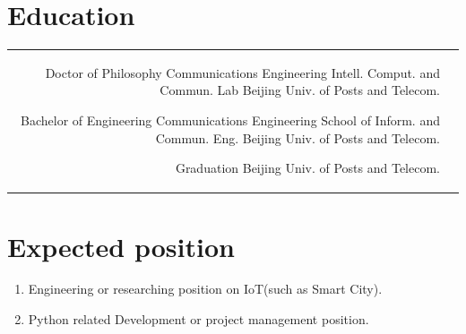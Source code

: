 \documentclass[10pt]{article} %
\begin{document}
\begin{paracol}{2}
\section{Education} 
\begin{supertabular}{rl} %
	
	
	{Doctor of Philosophy} %
	{Communications Engineering} %
	{Intell. Comput. and Commun. Lab} %
	{Beijing Univ. of Posts and Telecom.} %
	
	
	{Bachelor of Engineering} %
	{Communications Engineering} %
	{School of Inform. and Commun. Eng.} %
	{Beijing Univ. of Posts and Telecom.} %
	
	{Graduation}%
	{} %
	{} %
	{Beijing Univ. of Posts and Telecom.} %
\end{supertabular}

\section{Expected position}

\begin{enumerate}[font=\color{headings}\bfseries] %
	
	
	\item Engineering or researching position on IoT(such as Smart City).
	
	
	\item Python related Development or project management position.
\end{enumerate}


\end{paracol}
\end{document}
